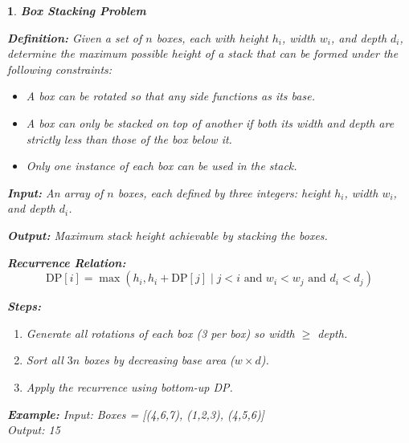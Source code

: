 \documentclass[%
addpoints]{exam}
\theoremstyle{problem}
\newtheorem{p}{}
\begin{document}
\begin{p}
\textbf{Box Stacking Problem}

\textbf{Definition:} Given a set of $n$ boxes, each with height $h_i$, width $w_i$, and depth $d_i$, determine the maximum possible height of a stack that can be formed under the following constraints:
\begin{itemize}
\item A box can be rotated so that any side functions as its base.
\item A box can only be stacked on top of another if both its width and depth are strictly less than those of the box below it.
\item Only one instance of each box can be used in the stack.
\end{itemize}

\textbf{Input:} An array of $n$ boxes, each defined by three integers: height $h_i$, width $w_i$, and depth $d_i$.

\textbf{Output:} Maximum stack height achievable by stacking the boxes.

\textbf{Recurrence Relation:}
\[ \text{DP}[i] = \max (h_i, h_i + \text{DP}[j] \mid j < i \text{ and } w_i < w_j \text{ and } d_i < d_j ) \]

\textbf{Steps:}
\begin{enumerate}
\item Generate all rotations of each box (3 per box) so width $\geq$ depth.
\item Sort all $3n$ boxes by decreasing base area ($w \times d$).
\item Apply the recurrence using bottom-up DP.
\end{enumerate}

\textbf{Example:} Input: Boxes = [(4,6,7), (1,2,3), (4,5,6)]\\
Output: 15
\hfill \end{p}
\end{document}
